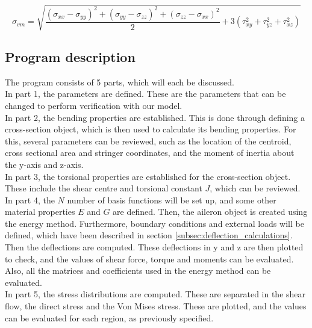 \begin{equation}\label{eq:vonmises}
\sigma_{vm} = \sqrt{\frac{(\sigma_{xx}-\sigma_{yy})^2+(\sigma_{yy}-\sigma_{zz})^2+(\sigma_{zz}-\sigma_{xx})^2}{2} + 3 (\tau_{xy}^2+\tau_{yz}^2+\tau_{xz}^2)}
\end{equation}

\subsection{Program description}
The program consists of 5 parts, which will each be discussed. \\

\noindent In part 1, the parameters are defined. These are the parameters that can be changed to perform verification with our model. \\

\noindent In part 2, the bending properties are established. This is done through defining a cross-section object, which is then used to calculate its bending properties. For this, several parameters can be reviewed, such as the location of the centroid, cross sectional area and stringer coordinates, and the moment of inertia about the y-axis and z-axis.\\

\noindent In part 3, the torsional properties are established for the cross-section object. These include the shear centre and torsional constant $J$, which can be reviewed. \\

\noindent In part 4, the $N$ number of basis functions will be set up, and some other material properties $E$ and $G$ are defined. Then, the aileron object is created using the energy method. Furthermore, boundary conditions and external loads will be defined, which have been described in section \ref{subsec:deflection_calculations}. Then the deflections are computed. These deflections in y and z are then plotted to check, and the values of shear force, torque and moments can be evaluated. Also, all the matrices and coefficients used in the energy method can be evaluated.\\

\noindent In part 5, the stress distributions are computed. These are separated in the shear flow, the direct stress and the Von Mises stress. These are plotted, and the values can be evaluated for each region, as previously specified.